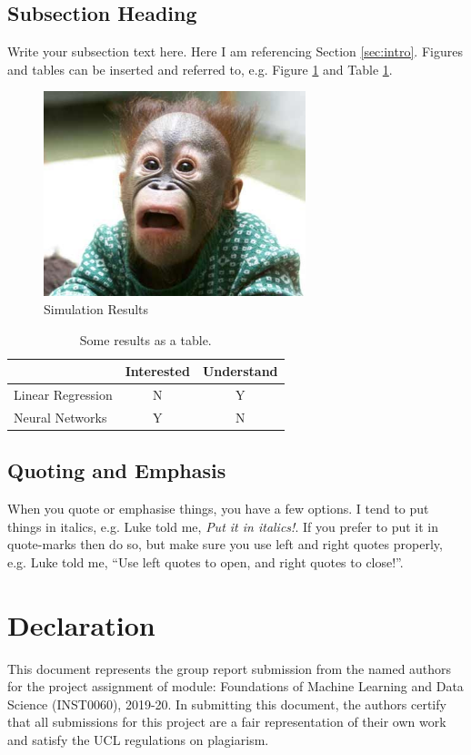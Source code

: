 \documentclass[11point]{article}
\begin{document}
\subsection{Subsection Heading}
Write your subsection text here. Here I am referencing Section \ref{sec:intro}. Figures and tables can be inserted and referred to, e.g. Figure \ref{fig:simulation_figure} and Table \ref{tbl:results_table}.

\begin{figure}
    \centering
    \includegraphics[width=3.0in]{myfigure}
    \caption{Simulation Results}
    \label{fig:simulation_figure}
\end{figure}

\begin{table}[htb]
  \centering
  \begin{tabular}{lcc}
  \toprule
  & Interested & Understand \\
  \midrule
  Linear Regression & N & Y \\
  Neural Networks & Y & N \\
  \bottomrule
  \end{tabular}
  \caption{Some results as a table.}
  \label{tbl:results_table}
\end{table}

\subsection{Quoting and Emphasis}
When you quote or emphasise things, you have a few options. I tend to put things in italics, e.g. Luke told me, \emph{Put it in italics!}. If you prefer to put it in quote-marks then do so, but make sure you use left and right quotes properly, e.g. Luke told me, ``Use left quotes to open, and right quotes to close!''.








\section*{Declaration}
This document represents the group report submission from the named authors for the project assignment of module: Foundations of Machine Learning and Data Science (INST0060), 2019-20. In submitting this document, the authors certify that all submissions for this project are a fair representation of their own work and satisfy the UCL regulations on  plagiarism.



\end{document}
